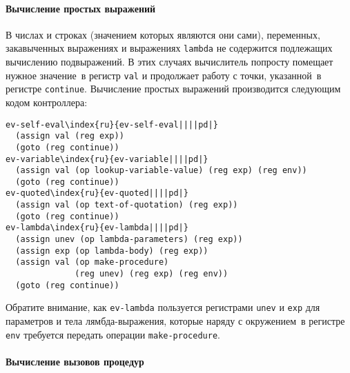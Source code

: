 \paragraph{Вычисление простых выражений}


В числах и строках (значением которых являются они сами),
переменных, закавыченных выражениях и выражениях {\tt lambda}
не содержится подлежащих вычислению подвыражений.  В этих случаях
вычислитель попросту помещает нужное значение~в регистр
{\tt val} и продолжает работу с точки, указанной~в регистре
{\tt continue}.  Вычисление простых выражений производится
следующим кодом контроллера:

\begin{Verbatim}[fontsize=\small]
ev-self-eval\index{ru}{ev-self-eval||||pd|}
  (assign val (reg exp))
  (goto (reg continue))
ev-variable\index{ru}{ev-variable||||pd|}
  (assign val (op lookup-variable-value) (reg exp) (reg env))
  (goto (reg continue))
ev-quoted\index{ru}{ev-quoted||||pd|}
  (assign val (op text-of-quotation) (reg exp))
  (goto (reg continue))
ev-lambda\index{ru}{ev-lambda||||pd|}
  (assign unev (op lambda-parameters) (reg exp))
  (assign exp (op lambda-body) (reg exp))
  (assign val (op make-procedure)
              (reg unev) (reg exp) (reg env))
  (goto (reg continue))
\end{Verbatim}
Обратите внимание, как {\tt ev-lambda} пользуется регистрами
{\tt unev} и {\tt exp} для параметров и тела
лямбда-выражения, которые наряду с окружением~в регистре
{\tt env} требуется передать операции
{\tt make-procedure}.

\paragraph{Вычисление вызовов процедур}


